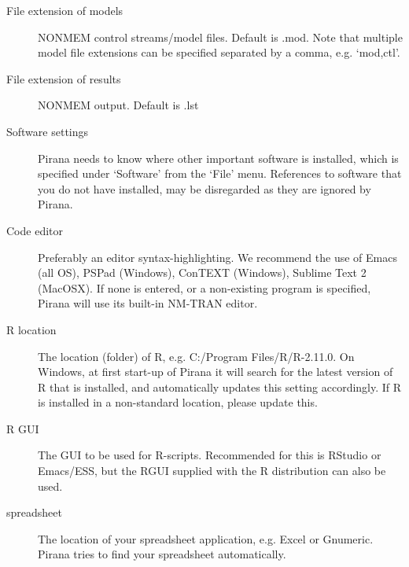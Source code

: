 \begin{description}
\item[File extension of models] NONMEM control streams/model files. Default is .mod. Note that multiple
model file extensions can be specified separated by a comma, e.g. `mod,ctl'. 
\item[File extension of results] NONMEM output. Default is .lst

\item[Software settings] Pirana needs to know where other important software is installed,
which is specified under `Software' from the `File' menu. References
to software that you do not have installed, may be disregarded as they
are ignored by Pirana.

\item[Code editor] Preferably an editor syntax-highlighting. We
  recommend the use of Emacs (all OS), PSPad (Windows), ConTEXT (Windows), Sublime Text 2 (MacOSX). If none is
  entered, or a non-existing program is specified, Pirana will use its
  built-in NM-TRAN editor.
\item[R location] The location (folder) of R, e.g. C:/Program
  Files/R/R-2.11.0. On Windows, at first start-up of Pirana it will
  search for the latest version of R that is installed, and
  automatically updates this setting accordingly. If R is installed in
  a non-standard location, please update this.
\item[R GUI] The GUI to be used for R-scripts. Recommended for this is
  RStudio or Emacs/ESS, but the RGUI supplied with the R distribution
  can also be used.
\item[spreadsheet] The location of your spreadsheet application,
    e.g. Excel or Gnumeric. Pirana tries to find your spreadsheet
    automatically.
\end{description}

